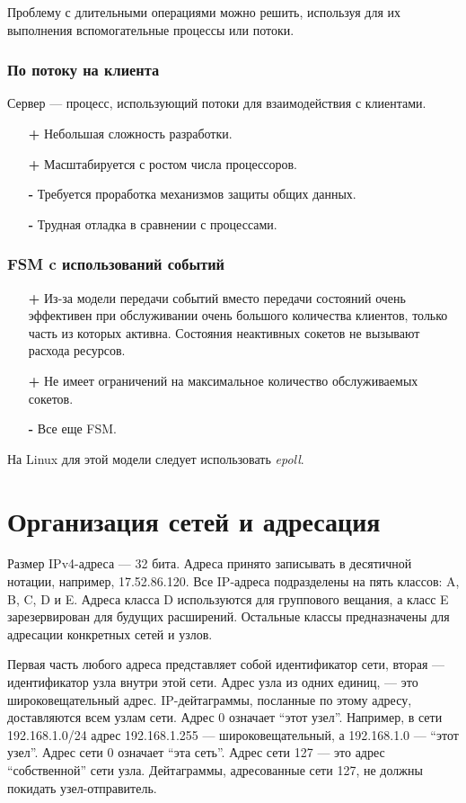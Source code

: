 Проблему с длительными операциями можно решить, используя для их выполнения вспомогательные процессы или потоки.

\subsubsection{По потоку на клиента}
Сервер --- процесс, использующий потоки для взаимодействия с клиентами.
\begin{itemize}
  \item[\textbf{+}] Небольшая сложность разработки.
  \item[\textbf{+}] Масштабируется с ростом числа процессоров.
  \item[\textbf{-}] Требуется проработка механизмов защиты общих данных.
  \item[\textbf{-}] Трудная отладка в сравнении с процессами.
\end{itemize}

\subsubsection{FSM c использований событий}
\begin{itemize}
  \item[\textbf{+}] Из-за модели передачи событий вместо передачи состояний очень эффективен при обслуживании очень большого количества клиентов, только часть из которых активна. Состояния неактивных сокетов не вызывают расхода ресурсов.
  \item[\textbf{+}] Не имеет ограничений на максимальное количество обслуживаемых сокетов.
  \item[\textbf{-}] Все еще FSM.
\end{itemize}

На Linux для этой модели следует использовать \emph{epoll}.

\section{Организация сетей и адресация}
\label{sec:network-setup}

Размер IPv4-адреса --- 32 бита. Адреса принято записывать в десятичной нотации, например, 17.52.86.120. Все IP-адреса подразделены на пять классов: A, B, C, D и E. Адреса класса D используются для группового вещания, а класс E зарезервирован для будущих расширений. Остальные классы предназначены для адресации конкретных сетей и узлов.

Первая часть любого адреса представляет собой идентификатор сети, вторая --- идентификатор узла внутри этой сети. Адрес узла из одних единиц, --- это широковещательный адрес. IP-дейтаграммы, посланные по этому адресу, доставляются всем узлам сети. Адрес 0 означает ``этот узел''. Например, в сети 192.168.1.0/24 адрес 192.168.1.255 --- широковещательный, а 192.168.1.0 --- ``этот узел''. Адрес сети 0 означает ``эта сеть''. Адрес сети 127 --- это адрес ``собственной'' сети узла. Дейтаграммы, адресованные сети 127, не должны покидать узел-отправитель.

